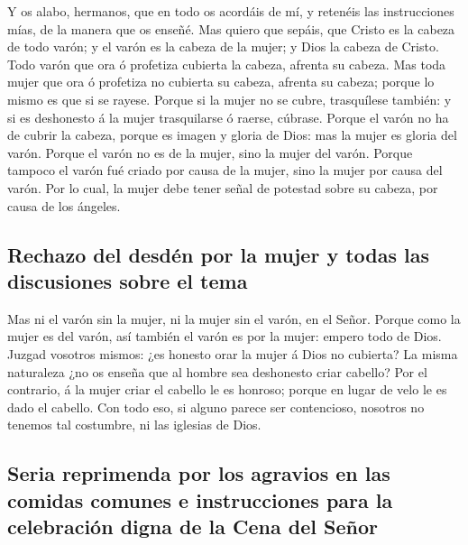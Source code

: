  Y os alabo, hermanos, que en todo os acordáis de mí, y
retenéis las instrucciones mías, de la manera que os enseñé.
 Mas quiero que sepáis, que Cristo es la cabeza de todo
varón; y el varón es la cabeza de la mujer; y Dios la cabeza de Cristo.
 Todo varón que ora ó profetiza cubierta la cabeza,
afrenta su cabeza.  Mas toda mujer que ora ó profetiza no
cubierta su cabeza, afrenta su cabeza; porque lo mismo es que si se
rayese.  Porque si la mujer no se cubre, trasquílese
también: y si es deshonesto á la mujer trasquilarse ó raerse, cúbrase.
 Porque el varón no ha de cubrir la cabeza, porque es
imagen y gloria de Dios: mas la mujer es gloria del varón.
 Porque el varón no es de la mujer, sino la mujer del
varón.  Porque tampoco el varón fué criado por causa de la
mujer, sino la mujer por causa del varón.  Por lo cual,
la mujer debe tener señal de potestad sobre su cabeza, por causa de los
ángeles.

\hypertarget{rechazo-del-desduxe9n-por-la-mujer-y-todas-las-discusiones-sobre-el-tema}{%
\subsection{Rechazo del desdén por la mujer y todas las discusiones
sobre el
tema}\label{rechazo-del-desduxe9n-por-la-mujer-y-todas-las-discusiones-sobre-el-tema}}

 Mas ni el varón sin la mujer, ni la mujer sin el varón,
en el Señor.  Porque como la mujer es del varón, así
también el varón es por la mujer: empero todo de Dios. 
Juzgad vosotros mismos: ¿es honesto orar la mujer á Dios no cubierta?
 La misma naturaleza ¿no os enseña que al hombre sea
deshonesto criar cabello?  Por el contrario, á la mujer
criar el cabello le es honroso; porque en lugar de velo le es dado el
cabello.  Con todo eso, si alguno parece ser contencioso,
nosotros no tenemos tal costumbre, ni las iglesias de Dios.

\hypertarget{seria-reprimenda-por-los-agravios-en-las-comidas-comunes-e-instrucciones-para-la-celebraciuxf3n-digna-de-la-cena-del-seuxf1or}{%
\subsection{Seria reprimenda por los agravios en las comidas comunes e
instrucciones para la celebración digna de la Cena del
Señor}\label{seria-reprimenda-por-los-agravios-en-las-comidas-comunes-e-instrucciones-para-la-celebraciuxf3n-digna-de-la-cena-del-seuxf1or}}

